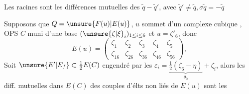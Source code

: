 Les racines sont les différences mutuelles des $\tilde q-\tilde q'$, avec $\tilde q'\ne\tilde q,\sigma\tilde q=-\tilde q$

Supposons que $Q=\unsure{F(u)|E(u)}$, $u$ sommet d'un complexe cubique , OPS $C$ muni d'une base $(\unsure{\zeta|\xi}_i)_{1\le i\le6}$ et  $u=\zeta'_6$, donc
\[
E(u)=\begin{pmatrix}\zeta_1&\zeta_2&\zeta_3&\zeta_4&\zeta_5\\\zeta_{16}&\zeta_{26}&\zeta_{36}&\zeta_{46}&\zeta_{56}\end{pmatrix},
\]
 Soit $\unsure{E'|E_f}\subset\frac12 E(C)$ engendré par les  $\varepsilon_i=\underbrace{\frac12(\zeta_6-\eta)}_{\theta_0}+\zeta_i$, alors les diff. mutuelles dans $\widehat E(C)$ des couples d'élts non liés de $E(u)$ sont les
